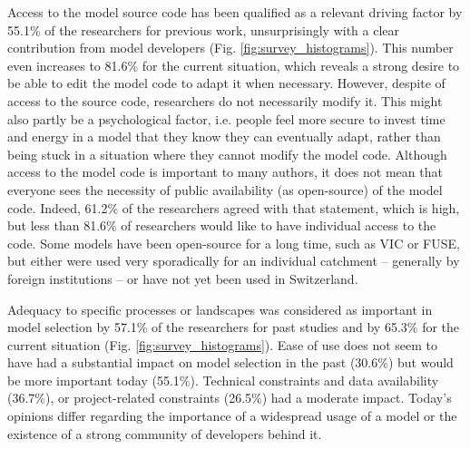 \documentclass[10pt,a4paper]{article}
\begin{document}
Access to the model source code has been qualified as a relevant driving factor by 55.1\% of the researchers for previous work, unsurprisingly with a clear contribution from model developers (Fig. \ref{fig:survey_histograms}). This number even increases to 81.6\% for the current situation, which reveals a strong desire to be able to edit the model code to adapt it when necessary. However, despite of access to the source code, researchers do not necessarily modify it. This might also partly be a psychological factor, i.e. people feel more secure to invest time and energy in a model that they know they can eventually adapt, rather than being stuck in a situation where they cannot modify the model code. Although access to the model code is important to many authors, it does not mean that everyone sees the necessity of public availability (as open-source) of the model code. Indeed, 61.2\% of the researchers agreed with that statement, which is high, but less than 81.6\% of researchers would like to have individual access to the code. Some models have been open-source for a long time, such as VIC or FUSE, but either were used very sporadically for an individual catchment -- generally by foreign institutions -- or have not yet been used in Switzerland.

Adequacy to specific processes or landscapes was considered as important in model selection by 57.1\% of the researchers for past studies and by 65.3\% for the current situation (Fig. \ref{fig:survey_histograms}). Ease of use does not seem to have had a substantial impact on model selection in the past (30.6\%) but would be more important today (55.1\%). Technical constraints and data availability (36.7\%), or project-related constraints (26.5\%) had a moderate impact. Today's opinions differ regarding the importance of a widespread usage of a model or the existence of a strong community of developers behind it. 
\end{document}
